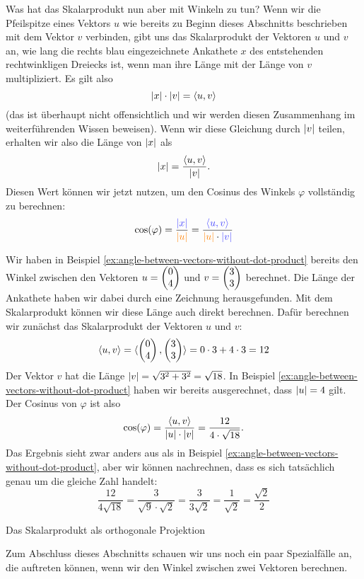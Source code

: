 \documentclass[../../main.tex]{subfiles}
\begin{document}
Was hat das Skalarprodukt nun aber mit Winkeln zu tun? Wenn wir die Pfeilspitze eines Vektors $u$ wie bereits zu Beginn 
dieses Abschnitts beschrieben mit dem Vektor $v$ verbinden, gibt uns das Skalarprodukt der Vektoren $u$ und $v$ an, wie
lang die rechts blau eingezeichnete Ankathete $x$ des entstehenden rechtwinkligen Dreiecks ist, wenn man ihre Länge mit der
Länge von $v$ multipliziert. Es gilt also
\[\lvert x\rvert\cdot \lvert v\rvert=\langle u, v \rangle\]
(das ist überhaupt nicht offensichtlich und wir werden diesen Zusammenhang im weiterführenden 
Wissen beweisen). Wenn wir diese Gleichung durch $\lvert v\rvert$ teilen, erhalten wir also die Länge von $\lvert x\rvert$ als
\[\lvert x\rvert=\frac{\langle u, v \rangle}{\lvert v\rvert}.\]
Diesen Wert können wir jetzt nutzen, um den Cosinus des Winkels $\varphi$ vollständig zu berechnen:
\[\cos(\varphi)
=\frac{\textcolor{blue!75}{\abs{x}}}{\textcolor{orange}{\abs{u}}}
=\frac{\textcolor{blue!75}{\inprod{u}{v}}}{\textcolor{orange}{\abs{u}}\cdot\textcolor{blue!75}{\abs{v}}}\]
\begin{example}{}
    Wir haben in Beispiel \ref{ex:angle-between-vectors-without-dot-product} bereits den Winkel zwischen den Vektoren
    $u=\begin{pmatrix} 0\\ 4 \end{pmatrix}$ und $v=\begin{pmatrix} 3\\ 3 \end{pmatrix}$ berechnet. Die Länge der Ankathete haben wir dabei durch eine Zeichnung 
    herausgefunden. Mit dem Skalarprodukt können wir diese Länge auch direkt berechnen. Dafür berechnen wir zunächst das
    Skalarprodukt der Vektoren $u$ und $v$:
    \[\langle u, v \rangle=\langle \begin{pmatrix} 0\\ 4 \end{pmatrix}, \begin{pmatrix} 3\\ 3 \end{pmatrix} \rangle=0\cdot 3+4\cdot 3=12\]
    Der Vektor $v$ hat die Länge $\lvert v\rvert=\sqrt{3^2+3^2}=\sqrt{18}$. In Beispiel \ref{ex:angle-between-vectors-without-dot-product}
    haben wir bereits ausgerechnet, dass $\lvert u\rvert=4$ gilt. Der Cosinus von $\varphi$ ist also
    \[\cos(\varphi)=\frac{\langle u, v \rangle}{\lvert u\rvert\cdot\lvert v\rvert}=\frac{12}{4\cdot\sqrt{18}}.\]
    Das Ergebnis sieht zwar anders aus als in Beispiel \ref{ex:angle-between-vectors-without-dot-product}, aber wir
    können nachrechnen, dass es sich tatsächlich genau um die gleiche Zahl handelt:
    \[\frac{12}{4\sqrt{18}}=\frac{3}{\sqrt{9}\cdot\sqrt{2}}=\frac{3}{3\sqrt{2}}=\frac{1}{\sqrt{2}}=\frac{\sqrt{2}}{2}\]
\end{example}
\begin{advanced}{Das Skalarprodukt als orthogonale Projektion}
\end{advanced}

Zum Abschluss dieses Abschnitts schauen wir uns noch ein paar Spezialfälle an, die auftreten können, wenn wir den
Winkel zwischen zwei Vektoren berechnen.
\end{document}
